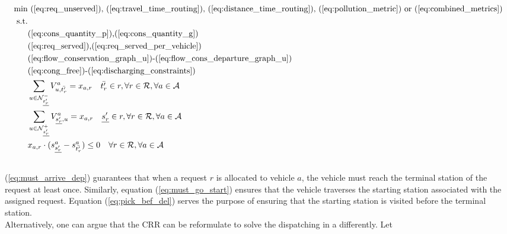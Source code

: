 \begin{align}
	\text{min}&  \text{
		(\ref{eq:req_unserved}),
		(\ref{eq:travel_time_routing}), (\ref{eq:distance_time_routing}), (\ref{eq:pollution_metric}) or (\ref{eq:combined_metrics})
	}\nonumber\\
	\text{s.t.} &\nonumber\\
	&\text{(\ref{eq:cons_quantity_p}),(\ref{eq:cons_quantity_g})}\nonumber\\	
	&\text{(\ref{eq:req_served}),(\ref{eq:req_served_per_vehicle})}\nonumber\\	
	&\text{(\ref{eq:flow_conservation_graph_u})-(\ref{eq:flow_cons_departure_graph_u})}\nonumber\\
	&\text{(\ref{eq:cong_free})-(\ref{eq:discharging_constraints})}\nonumber\\
	&\sum_{u \in \mathcal{N}^-_{\underline{t'_r}} } V^a_{u, \bar{t'_r}} = x_{a,r} \quad  \bar{t'_r} \in r, \forall r \in \mathcal{R}, \forall a \in \mathcal{A} \label{eq:must_arrive_dep}	\\
	&\sum_{u \in \mathcal{N}^+_{\underline{s'_r}} } V^a_{ \underline{s'_r}, u} = x_{a,r} \quad  \underline{s'_r} \in r, \forall r \in \mathcal{R}, \forall a \in \mathcal{A}\label{eq:must_go_start}\\
	&x_{a,r}\cdot(s_{\underline{s'_r}}^a - s_{\bar{t'_r}}^a) \leq 0 \quad \forall r \in \mathcal{R}, \forall a \in \mathcal{A}\label{eq:pick_bef_del}\\
	\nonumber
\end{align}
(\ref{eq:must_arrive_dep}) guarantees that when a request $r$ is allocated to vehicle $a$, the vehicle must reach the terminal station of the request at least once. Similarly, equation (\ref{eq:must_go_start}) ensures that the vehicle traverses the starting station associated with the assigned request. Equation (\ref{eq:pick_bef_del}) serves the purpose of ensuring that the starting station is visited before the terminal station.\\
Alternatively, one can argue that the CRR can be reformulate to solve the dispatching in a differently. Let 

